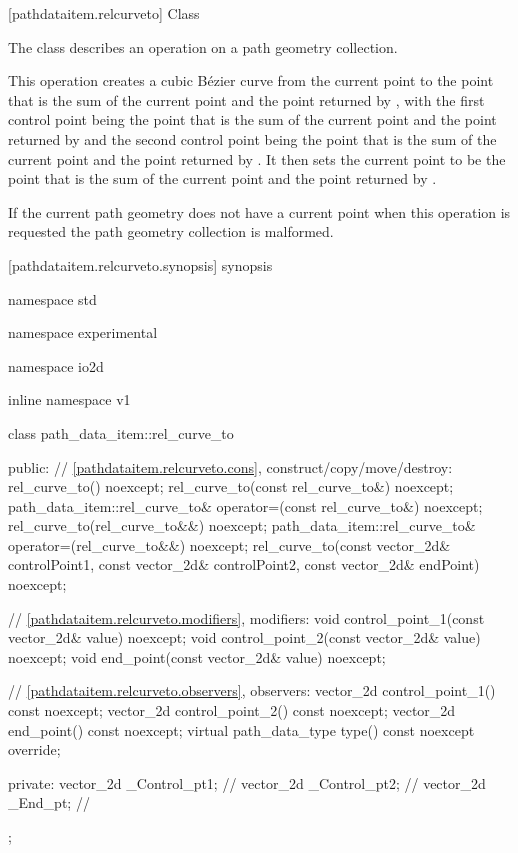  [pathdataitem.relcurveto] {Class }

\pnum
{}
The class  describes an operation on a path geometry collection.

\pnum
This operation creates a cubic B\'ezier curve from the current point to the point that is the sum of the current point and the point returned by , with the first control point being the point that is the sum of the current point and the point returned by  and the second control point being the point that is the sum of the current point and the point returned by . It then sets the current point to be the point that is the sum of the current point and the point returned by .

\pnum
If the current path geometry does not have a current point when this operation is requested the path geometry collection is malformed.

 [pathdataitem.relcurveto.synopsis] { synopsis}

\begin{codeblock}
namespace std { namespace experimental { namespace io2d { inline namespace v1 {
  class path_data_item::rel_curve_to {
  public:
    // \ref{pathdataitem.relcurveto.cons}, construct/copy/move/destroy:
    rel_curve_to() noexcept;
    rel_curve_to(const rel_curve_to&) noexcept;
    path_data_item::rel_curve_to& operator=(const rel_curve_to&) noexcept;
    rel_curve_to(rel_curve_to&&) noexcept;
    path_data_item::rel_curve_to& operator=(rel_curve_to&&) noexcept;
    rel_curve_to(const vector_2d& controlPoint1, const vector_2d& controlPoint2,
      const vector_2d& endPoint) noexcept;

    // \ref{pathdataitem.relcurveto.modifiers}, modifiers:
    void control_point_1(const vector_2d& value) noexcept;
    void control_point_2(const vector_2d& value) noexcept;
    void end_point(const vector_2d& value) noexcept;

    // \ref{pathdataitem.relcurveto.observers}, observers:
    vector_2d control_point_1() const noexcept;
    vector_2d control_point_2() const noexcept;
    vector_2d end_point() const noexcept;
    virtual path_data_type type() const noexcept override;
    
  private:
    vector_2d _Control_pt1; // \expos
    vector_2d _Control_pt2; // \expos
    vector_2d _End_pt;      // \expos
  };
} } } }
\end{codeblock}

